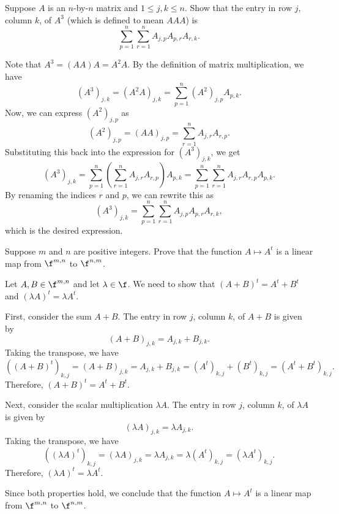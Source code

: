 \begin{exercise}[3c13]
    Suppose $A$ is an $n$-by-$n$ matrix and $1 \leq j, k \leq n$. Show that the entry in row $j$, column $k$, of $A^3$ (which is defined to mean $AAA$) is
    \[\sum_{p = 1}^{n} \sum_{r = 1}^{n} A_{j, p} A_{p, r} A_{r, k}.\]
\end{exercise}

\begin{sol}
    Note that $A^3 = (AA)A = A^2 A$. By the definition of matrix multiplication, we have
    \[(A^3)_{j, k} = (A^2 A)_{j, k} = \sum_{p = 1}^{n} (A^2)_{j, p} A_{p, k}.\]
    Now, we can express $(A^2)_{j, p}$ as
    \[(A^2)_{j, p} = (AA)_{j, p} = \sum_{r = 1}^{n} A_{j, r} A_{r, p}.\]
    Substituting this back into the expression for $(A^3)_{j, k}$, we get
    \[(A^3)_{j, k} = \sum_{p = 1}^{n} \left( \sum_{r = 1}^{n} A_{j, r} A_{r, p} \right) A_{p, k} = \sum_{p = 1}^{n} \sum_{r = 1}^{n} A_{j, r} A_{r, p} A_{p, k}.\]
    By renaming the indices $r$ and $p$, we can rewrite this as
    \[(A^3)_{j, k} = \sum_{p = 1}^{n} \sum_{r = 1}^{n} A_{j, p} A_{p, r} A_{r, k},\]
    which is the desired expression.
\end{sol}

\begin{exercise}[3c14]
    Suppose $m$ and $n$ are positive integers. Prove that the function $A \mapsto A^t$ is a linear map from $\f^{m, n}$ to $\f^{n, m}$.
\end{exercise}

\begin{sol}
    Let $A, B \in \f^{m, n}$ and let $\lambda \in \f$. We need to show that $(A + B)^t = A^t + B^t$ and $(\lambda A)^t = \lambda A^t$.

    First, consider the sum $A + B$. The entry in row $j$, column $k$, of $A + B$ is given by
    \[(A + B)_{j, k} = A_{j, k} + B_{j, k}.\]
    Taking the transpose, we have
    \[((A + B)^t)_{k, j} = (A + B)_{j, k} = A_{j, k} + B_{j, k} = (A^t)_{k, j} + (B^t)_{k, j} = (A^t + B^t)_{k, j}.\]
    Therefore, $(A + B)^t = A^t + B^t$.

    Next, consider the scalar multiplication $\lambda A$. The entry in row $j$, column $k$, of $\lambda A$ is given by
    \[(\lambda A)_{j, k} = \lambda A_{j, k}.\]
    Taking the transpose, we have
    \[((\lambda A)^t)_{k, j} = (\lambda A)_{j, k} = \lambda A_{j, k} = \lambda (A^t)_{k, j} = (\lambda A^t)_{k, j}.\]
    Therefore, $(\lambda A)^t = \lambda A^t$.

    Since both properties hold, we conclude that the function $A \mapsto A^t$ is a linear map from $\f^{m, n}$ to $\f^{n, m}$.
\end{sol}

